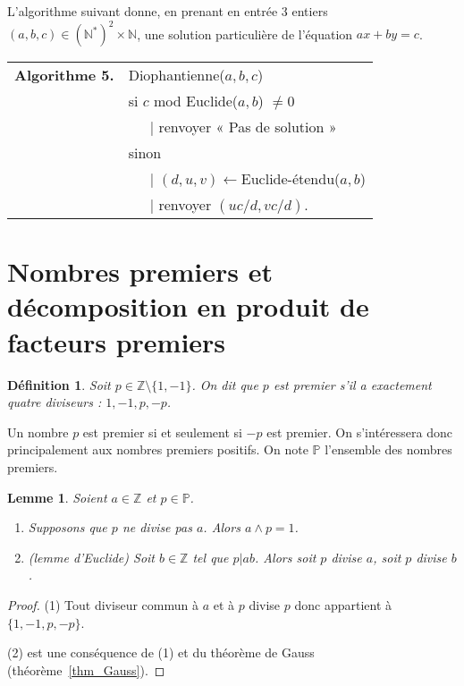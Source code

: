 \documentclass[10pt,a4paper]{report}
\newtheorem{Def}[thm]{Définition}
\newtheorem{Lem}[thm]{Lemme}
\newcommand{\Z}{\mathbb{Z}}
\begin{document}
L'algorithme suivant donne, en prenant en entrée 3 entiers $(a,b,c)\in (\mathbb{N}^*)^2 \times \mathbb{N}$, une solution particulière de l'équation $ax+by=c$.

\begin{tabular}{ll}
\textbf{Algorithme 5.} & Diophantienne($a,b,c$)\\
& si $c$ mod Euclide($a,b$) $\neq 0 $ \\
& \ \ \ {\rm |} renvoyer « Pas de solution »  \\
& sinon \\
& \ \ \ {\rm | }  $(d,u,v)  \leftarrow $Euclide-étendu($a,b$) \\
& \ \ \ {\rm |} renvoyer $(uc/d,vc/d)$. 
\end{tabular}



\section{Nombres premiers et décomposition en produit de facteurs premiers}

\begin{Def}
Soit $p\in \Z\setminus \{1,-1\}$. On dit que $p$ est premier s'il a exactement quatre diviseurs : $1,-1,p,-p$.
\end{Def}

Un nombre $p$ est premier si et seulement si $-p$ est premier. On s'intéressera donc principalement aux nombres premiers positifs. On note $\mathbb{P}$ l'ensemble des nombres premiers.
 
\begin{Lem}\label{lem_Euclide}
Soient $a\in \Z$ et $p\in \mathbb{P}$. \begin{enumerate}
\item Supposons que $p$ ne divise pas $a$. Alors $a\wedge p=1$.

\item (lemme d'Euclide) Soit $b\in \Z$ tel que $p|ab$. Alors soit $p$ divise $a$, soit $p$ divise $b$.
\end{enumerate} 

\end{Lem}

\begin{proof}
(1) Tout diviseur commun à $a$ et à $p$ divise $p$ donc appartient à $\{1,-1,p,-p\}$.  

(2) est une conséquence de (1) et du théorème de Gauss (théorème~\ref{thm_Gauss}).
\end{proof}
\end{document}
